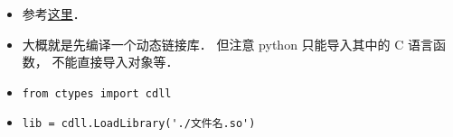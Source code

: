 
\begin{issues}
\issueDraft
\end{issues}

\begin{itemize}
\item 参考\href{https://www.geeksforgeeks.org/how-to-call-c-c-from-python/}{这里}．
\item 大概就是先编译一个动态链接库． 但注意 python 只能导入其中的 C 语言函数， 不能直接导入对象等．
\item \verb|from ctypes import cdll|
\item \verb|lib = cdll.LoadLibrary('./文件名.so')|
\end{itemize}
